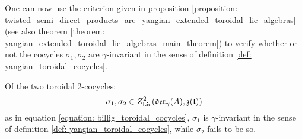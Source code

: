         One can now use the criterion given in proposition \ref{proposition: twisted_semi_direct_products_are_yangian_extended_toroidal_lie_algebras} (see also theorem \ref{theorem: yangian_extended_toroidal_lie_algebras_main_theorem}) to verify whether or not the cocycles $\sigma_1, \sigma_2$ are $\gamma$-invariant in the sense of definition \ref{def: yangian_toroidal_cocycles}.
        \begin{proposition} \label{prop: invariance_of_billig_toroidal_cocycles}
            Of the two toroidal $2$-cocycles:
                $$\sigma_1, \sigma_2 \in Z^2_{\mathrm{Lie}}(\mathfrak{der}_{\gamma}(A), \mathfrak{z}(\mathfrak{t}))$$
            as in equation \eqref{equation: billig_toroidal_cocycles}, $\sigma_1$ is $\gamma$-invariant in the sense of definition \ref{def: yangian_toroidal_cocycles}, while $\sigma_2$ fails to be so.
        \end{proposition}
